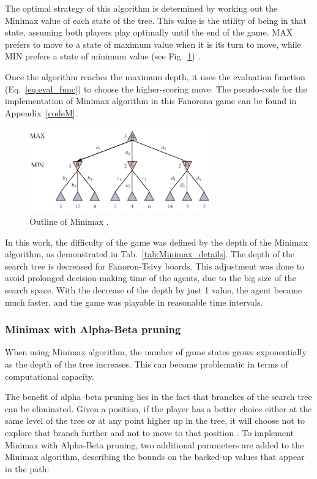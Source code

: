 \documentclass[journal]{IEEEtran}
\begin{document}
The optimal strategy of this algorithm is determined by working out the Minimax value of each state of the tree. This value is the utility of being in that state, assuming both players play optimally until the end of the game. MAX prefers to move to a state of maximum value when it is its turn to move, while MIN prefers a state of minimum value (see Fig.~\ref{fig:minimax}) \cite{russell2020}.

Once the algorithm reaches the maximum depth, it uses the evaluation function (Eq.~\ref{eq:eval_func}) to choose the higher-scoring move. The pseudo-code for the implementation of Minimax algorithm in this Fanorona game can be found in Appendix~\ref{codeM}.

\begin{figure}[h!]
    \centering
    \includegraphics[width = 8cm]{minimax}
    \caption{Outline of Minimax \cite{russell2020}.}
    \label{fig:minimax}
\end{figure}

In this work, the difficulty of the game was defined by the depth of the Minimax algorithm, as demonstrated in Tab.~\ref{tab:Minimax_details}. The depth of the search tree is decreased for Fanoron-Tsivy boards. This adjustment was done to avoid prolonged decision-making time of the agents, due to the big size of the search space.
With the decrease of the depth by just 1 value, the agent became much faster, and the game was playable in reasonable time intervals.

\subsubsection{\textbf{Minimax with Alpha-Beta pruning}}
When using Minimax algorithm, the number of game states grows exponentially as the depth of the tree increases. This can become problematic in terms of computational capacity.

The benefit of alpha–beta pruning lies in the fact that branches of the search tree can be eliminated.
Given a position, if the player has a better choice either at the same level of the tree or at any point higher up in the tree, it will choose not to explore that branch further and not to move to that position \cite{russell2020}. To implement Minimax with Alpha-Beta pruning, two additional parameters are added to the Minimax algorithm, describing the bounds on the backed-up values that appear in the path:
\end{document}
